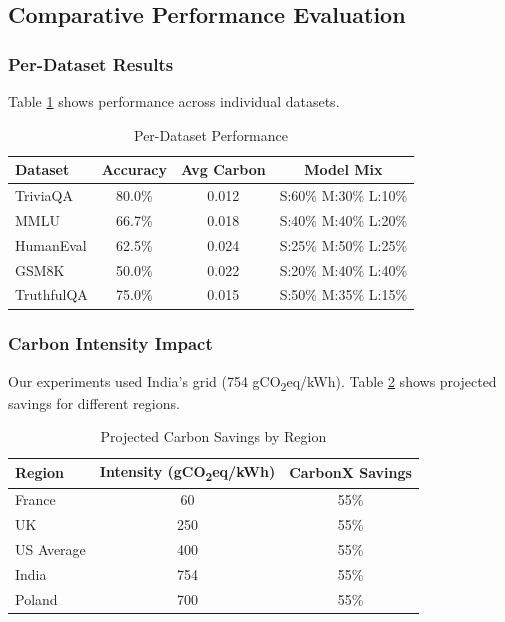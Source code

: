 \documentclass[conference]{IEEEtran}
\newcommand{\gco}{gCO\textsubscript{2}eq}
\begin{document}
\subsection{Comparative Performance Evaluation}

\subsubsection{Per-Dataset Results}

Table \ref{tab:per_dataset} shows performance across individual datasets.

\begin{table}[h]
\centering
\caption{Per-Dataset Performance}
\label{tab:per_dataset}
\begin{tabular}{lccc}
\toprule
\textbf{Dataset} & \textbf{Accuracy} & \textbf{Avg Carbon} & \textbf{Model Mix} \\
\midrule
TriviaQA & 80.0\% & 0.012 & S:60\% M:30\% L:10\% \\
MMLU & 66.7\% & 0.018 & S:40\% M:40\% L:20\% \\
HumanEval & 62.5\% & 0.024 & S:25\% M:50\% L:25\% \\
GSM8K & 50.0\% & 0.022 & S:20\% M:40\% L:40\% \\
TruthfulQA & 75.0\% & 0.015 & S:50\% M:35\% L:15\% \\
\bottomrule
\end{tabular}
\end{table}

\subsubsection{Carbon Intensity Impact}

Our experiments used India's grid (754 \gco{}/kWh). Table \ref{tab:regions} shows projected savings for different regions.

\begin{table}[h]
\centering
\caption{Projected Carbon Savings by Region}
\label{tab:regions}
\begin{tabular}{lcc}
\toprule
\textbf{Region} & \textbf{Intensity (\gco{}/kWh)} & \textbf{CarbonX Savings} \\
\midrule
France & 60 & 55\% \\
UK & 250 & 55\% \\
US Average & 400 & 55\% \\
India & 754 & 55\% \\
Poland & 700 & 55\% \\
\bottomrule
\end{tabular}
\end{table}
\end{document}
